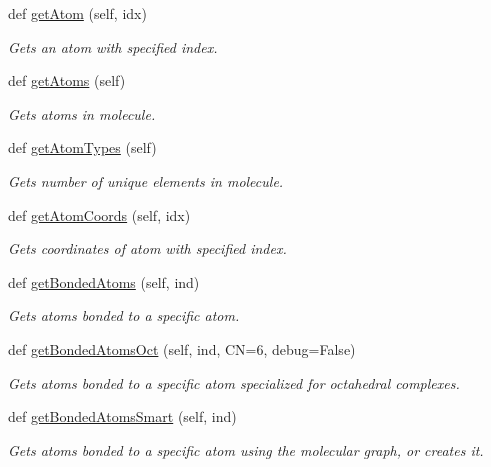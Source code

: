 \begin{DoxyCompactItemize}
def \hyperlink{classmolSimplify_1_1Classes_1_1mol3D_1_1mol3D_ad30b31562cb3c57c2758554ff7e3714d}{get\+Atom} (self, idx)
\begin{DoxyCompactList}\small\item\em Gets an atom with specified index. \end{DoxyCompactList}\item 
def \hyperlink{classmolSimplify_1_1Classes_1_1mol3D_1_1mol3D_a28a0a4e056758a2cc390899e9b34baaa}{get\+Atoms} (self)
\begin{DoxyCompactList}\small\item\em Gets atoms in molecule. \end{DoxyCompactList}\item 
def \hyperlink{classmolSimplify_1_1Classes_1_1mol3D_1_1mol3D_a53c044279fd5d0dace4f220c950921fa}{get\+Atom\+Types} (self)
\begin{DoxyCompactList}\small\item\em Gets number of unique elements in molecule. \end{DoxyCompactList}\item 
def \hyperlink{classmolSimplify_1_1Classes_1_1mol3D_1_1mol3D_a67307accd49f78a076a0139591fdefb7}{get\+Atom\+Coords} (self, idx)
\begin{DoxyCompactList}\small\item\em Gets coordinates of atom with specified index. \end{DoxyCompactList}\item 
def \hyperlink{classmolSimplify_1_1Classes_1_1mol3D_1_1mol3D_a394c680ec3eddbcc22ebcec76d211218}{get\+Bonded\+Atoms} (self, ind)
\begin{DoxyCompactList}\small\item\em Gets atoms bonded to a specific atom. \end{DoxyCompactList}\item 
def \hyperlink{classmolSimplify_1_1Classes_1_1mol3D_1_1mol3D_a054076c86f015de56353017cc391ba4c}{get\+Bonded\+Atoms\+Oct} (self, ind, CN=6, debug=False)
\begin{DoxyCompactList}\small\item\em Gets atoms bonded to a specific atom specialized for octahedral complexes. \end{DoxyCompactList}\item 
def \hyperlink{classmolSimplify_1_1Classes_1_1mol3D_1_1mol3D_afa8b020ddc30de3b82be2568be20aaa5}{get\+Bonded\+Atoms\+Smart} (self, ind)
\begin{DoxyCompactList}\small\item\em Gets atoms bonded to a specific atom using the molecular graph, or creates it. \end{DoxyCompactList}\item 

\end{DoxyCompactItemize}
